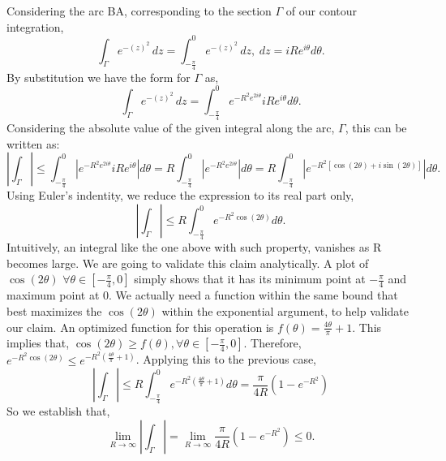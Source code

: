 \documentclass{article}
\begin{document}
Considering the arc BA, corresponding to the section $\Gamma$ of our contour integration,
\begin{equation}
    \int_{\Gamma} e^{-(z)^{2}} \, dz = \int_{-\frac{\pi}{4}}^{0} e^{-(z)^{2}} \, dz, \hspace{3pt} dz = iRe^{i\theta} d \theta. 
\end{equation}
By substitution we have the form for $\Gamma$ as,
\begin{equation}
    \int_{\Gamma} e^{-(z)^{2}} \, dz = \int_{-\frac{\pi}{4}}^{0} e^{-R^{2}e^{2i\theta}} iRe^{i\theta} d\theta. 
\end{equation}
Considering the absolute value of the given integral along the arc, $\Gamma$, this can be written as:
\begin{equation}
   \left| \int_{\Gamma} \right| \leq \int_{-\frac{\pi}{4}}^{0} \left|e^{-R^{2}e^{2i\theta}} iRe^{i\theta}\right| d\theta = R\int_{-\frac{\pi}{4}}^{0} \left|e^{-R^{2}e^{2i\theta}}\right| d\theta = R\int_{-\frac{\pi}{4}}^{0} \left|e^{-R^{2}[{\cos{(2\theta)} + i\sin{(2\theta)}}]}\right| d\theta.
\end{equation}
Using Euler's indentity, we reduce the expression to its real part only,
\begin{equation}
   \left| \int_{\Gamma} \right| \leq R\int_{-\frac{\pi}{4}}^{0}e^{-R^{2}\cos(2\theta)}d\theta.
\end{equation}
Intuitively, an integral like the one above with such property, vanishes as R becomes large. We are going to validate this claim analytically. A plot of $\cos(2\theta)$ $\forall \theta \in [-\frac{\pi}{4}, 0]$ simply shows that it has its minimum point at $-\frac{\pi}{4}$ and maximum point at $0$. We actually need a function within the same bound that best maximizes the $\cos(2\theta)$ within the exponential argument, to help validate our claim. An optimized function for this operation is $f(\theta) = \frac{4\theta}{\pi}+1$. This implies that, $\cos(2\theta) \geq f(\theta), \forall \theta \in [-\frac{\pi}{4}, 0]$.
Therefore, $e^{-R^{2}\cos(2\theta)} \leq e^{-R^{2}(\frac{4\theta}{\pi}+1)}$. Applying this to the previous case, 
\begin{equation}
   \left| \int_{\Gamma} \right| \leq R\int_{-\frac{\pi}{4}}^{0}e^{-R^{2}(\frac{4\theta}{\pi}+1)}d\theta = \frac{\pi}{4R}(1 - e^{-R^{2}})
\end{equation}
So we establish that, 
\begin{equation}
\lim_{{R \to \infty}} \left| \int_{\Gamma} \right| = \lim_{{R \to \infty}} \frac{\pi}{4R}(1 - e^{-R^{2}}) \leq 0.
\end{equation}
\end{document}
